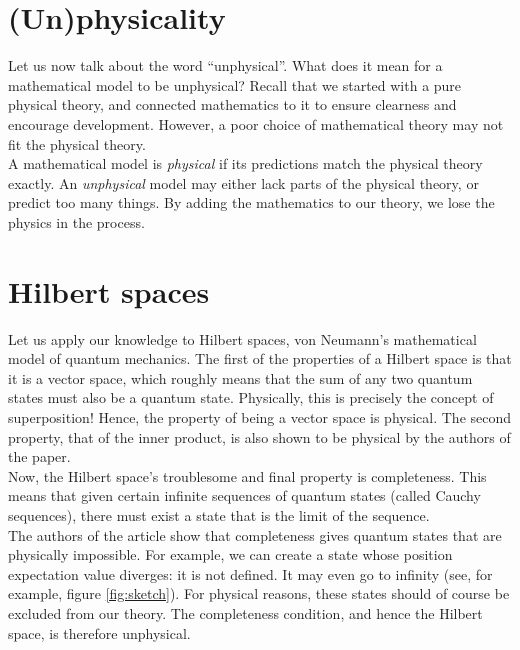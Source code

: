 \documentclass[12pt]{article}
\begin{document}
\begin{multicols}{2}
    \section*{(Un)physicality}
    Let us now talk about the word ``unphysical''. What does it mean for a mathematical model to be unphysical? Recall that we started with a pure physical theory, and connected mathematics to it to ensure clearness and encourage development. However, a poor choice of mathematical theory may not fit the physical theory.\\
    A mathematical model is \textit{physical} if its predictions match the physical theory exactly. An \textit{unphysical} model may either lack parts of the physical theory, or predict too many things. By adding the mathematics to our theory, we lose the physics in the process.
    \section*{Hilbert spaces}
    Let us apply our knowledge to Hilbert spaces, von Neumann's mathematical model of quantum mechanics. The first of the properties of a Hilbert space is that it is a vector space, which roughly means that the sum of any two quantum states must also be a quantum state. Physically, this is precisely the concept of superposition! Hence, the property of being a vector space is physical. The second property, that of the inner product, is also shown to be physical by the authors of the paper.\\
    Now, the Hilbert space's troublesome and final property is completeness. This means that given certain infinite sequences of quantum states (called Cauchy sequences), there must exist a state that is the limit of the sequence.\\
    The authors of the article show that completeness gives quantum states that are physically impossible. For example, we can create a state whose position expectation value diverges: it is not defined. It may even go to infinity (see, for example, figure \ref{fig:sketch}). For physical reasons, these states should of course be excluded from our theory. The completeness condition, and hence the Hilbert space, is therefore unphysical.

\end{multicols}
\end{document}
